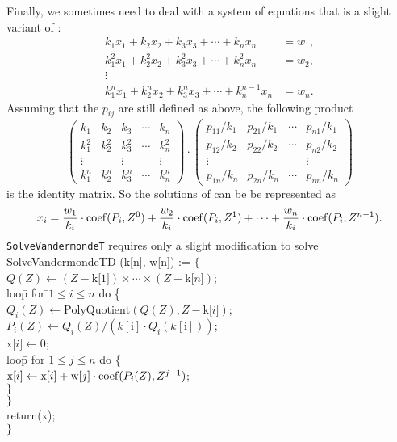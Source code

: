 Finally, we sometimes need to deal with a system of equations that is a
slight variant of :
\begin{equation}\label{TransD:Vander:Eq}
\begin{aligned}
k_1 x_1 + k_2 x_2 + k_3 x_3 + \cdots + k_n x_n & = w_1,\\
k_1^2 x_1 + k_2^2 x_2 + k_3^2 x_3 + \cdots + k_n^2 x_n & = w_2,\\
\vdots\\
k_1^{n} x_1 + k_2^{n} x_2 + k_3^{n} x_3 +
 \cdots + k_n^{n-1} x_n & = w_n.
\end{aligned}
\end{equation}
Assuming that the $p_{ij}$ are still defined as above, the following
product 
\[
\left(
\begin{array}{ccccc}
k_1 & k_2 & k_3 & \cdots & k_n \\
k_1^2 & k_2^2 & k_3^2 & \cdots & k_n^2 \\
\vdots & & \vdots & & \vdots \\
k_1^n & k_2^n & k_3^n & \cdots & k_n^n
\end{array}\right) \cdot
\left(
 \begin{array}{ccccc}
    p_{11}/k_1&p_{21}/k_1&\cdots&p_{n1}/k_1\\
    p_{12}/k_2&p_{22}/k_2&\cdots&p_{n2}/k_2\\
    \vdots& & &\vdots\\
    p_{1n}/k_n&p_{2n}/k_n&\cdots&p_{nn}/k_n
 \end{array}\right)
\]
is the identity matrix.  So the solutions of 
can be be represented as 
\[
x_i = \frac{w_1}{k_i} \cdot \operatorname{coef}(P_i, Z^0) + 
      \frac{w_2}{k_i} \cdot \operatorname{coef}(P_i, Z^1) + \cdots + 
      \frac{w_n}{k_i} \cdot \operatorname{coef}(P_i ,Z^{n-1}).
\]
{\tt SolveVandermondeT} requires only a slight modification to solve
\begindsacode
SolveVandermondeTD (k[n], w[n]) := $\{$ \\
\> $Q(Z) \leftarrow   (Z - \mbox{k[$1$]})\times \cdots \times (Z - \mbox{k[$n$]})$; \\
\> loo\=p for \=$1 \le i \le n$ do \{ \\
\>\> $Q_i(Z) \leftarrow \mbox{PolyQuotient}(Q(Z), Z - \mbox{k[$i$]})$; \\
\>\> $P_i(Z) \leftarrow Q_i(Z)/(k[\mbox{i}] \cdot Q_i(k[\mbox{i}]))$; \\
\>\> $\mbox{x[$i$]} \leftarrow 0$; \\
\>\> loo\=p for $1 \le j \le n$ do \{ \\
\>\>\> $\mbox{x[$i$]} \leftarrow \mbox{x[$i$]} + \mbox{w[$j$]} \cdot
\operatorname{coef}(P_i(Z), Z^{j-1})$;\\
\>\>\> $\}$ \\
\>\> $\}$ \\
\> return(x); \\
\> $\}$
\enddsacode

